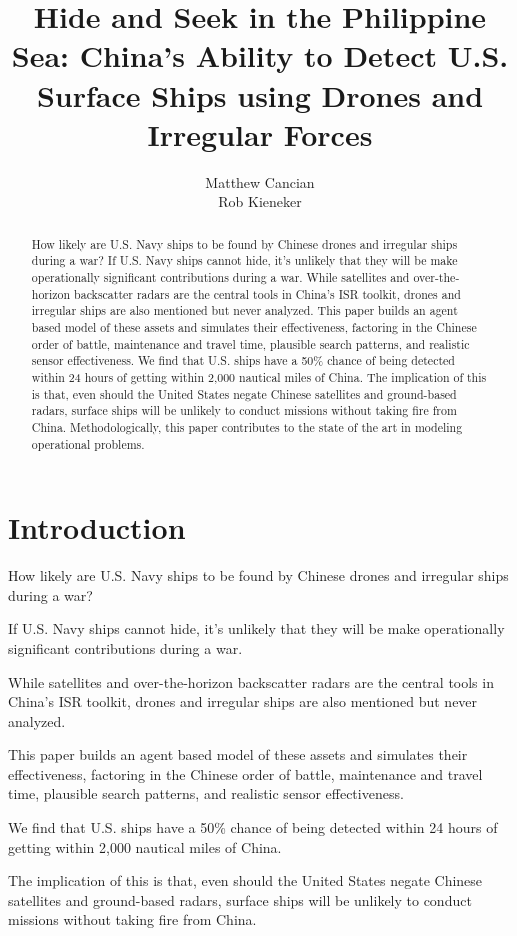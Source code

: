 \documentclass[12pt]{article}
\title{Hide and Seek in the Philippine Sea: China's Ability to Detect U.S. Surface Ships using Drones and Irregular Forces}
\author{Matthew Cancian \\ Rob Kieneker}
\date{}
\begin{document}
\maketitle

\begin{abstract}
How likely are U.S. Navy ships to be found by Chinese drones and irregular ships during a war? If U.S. Navy ships cannot hide, it's unlikely that they will be make operationally significant contributions during a war. While satellites and over-the-horizon backscatter radars are the central tools in China's ISR toolkit, drones and irregular ships are also mentioned but never analyzed. This paper builds an agent based model of these assets and simulates their effectiveness, factoring in the Chinese order of battle, maintenance and travel time, plausible search patterns, and realistic sensor effectiveness. We find that U.S. ships have a 50\% chance of being detected within 24 hours of getting within 2,000 nautical miles of China. The implication of this is that, even should the United States negate Chinese satellites and ground-based radars, surface ships will be unlikely to conduct missions without taking fire from China. Methodologically, this paper contributes to the state of the art in modeling operational problems.
\end{abstract}

\section{Introduction}
How likely are U.S. Navy ships to be found by Chinese drones and irregular ships during a war?

If U.S. Navy ships cannot hide, it's unlikely that they will be make operationally significant contributions during a war.

While satellites and over-the-horizon backscatter radars are the central tools in China's ISR toolkit, drones and irregular ships are also mentioned but never analyzed.

This paper builds an agent based model of these assets and simulates their effectiveness, factoring in the Chinese order of battle, maintenance and travel time, plausible search patterns, and realistic sensor effectiveness.

We find that U.S. ships have a 50\% chance of being detected within 24 hours of getting within 2,000 nautical miles of China.

The implication of this is that, even should the United States negate Chinese satellites and ground-based radars, surface ships will be unlikely to conduct missions without taking fire from China.
\end{document}
